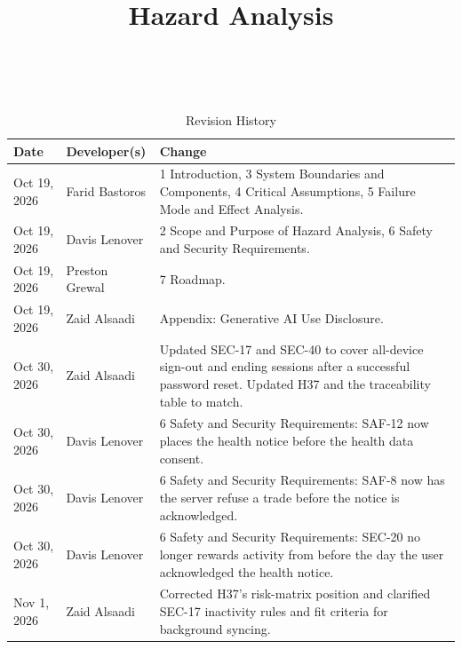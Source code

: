 \documentclass{article}
\title{Hazard Analysis\\\progname}
\author{\authname}
\date{}
\begin{document}
\maketitle
\thispagestyle{empty}

~\newpage


\begin{table}[hp]
\caption{Revision History} \label{TblRevisionHistory}
\begin{tabularx}{\textwidth}{llX}
\toprule
\textbf{Date} & \textbf{Developer(s)} & \textbf{Change}\\
\midrule
Oct 19, 2026 & Farid Bastoros & 1 Introduction, 3 System Boundaries and
Components, 4 Critical Assumptions, 5 Failure Mode and Effect Analysis.\\
Oct 19, 2026 & Davis Lenover & 2 Scope and Purpose of Hazard Analysis,
6 Safety and Security Requirements.\\
Oct 19, 2026 & Preston Grewal & 7 Roadmap.\\
Oct 19, 2026 & Zaid Alsaadi & Appendix: Generative AI Use Disclosure.\\
Oct 30, 2026 & Zaid Alsaadi & Updated SEC-17 and SEC-40 to cover
all-device sign-out and ending sessions after a successful password reset.
Updated H37 and the traceability table to match.\\
Oct 30, 2026 & Davis Lenover & 6 Safety and Security Requirements: SAF-12 now
places the health notice before the health data consent.\\
Oct 30, 2026 & Davis Lenover & 6 Safety and Security Requirements: SAF-8 now has
the server refuse a trade before the notice is acknowledged.\\
Oct 30, 2026 & Davis Lenover & 6 Safety and Security Requirements: SEC-20 no
longer rewards activity from before the day the user acknowledged the health
notice.\\
Nov 1, 2026 & Zaid Alsaadi & Corrected H37's risk-matrix position and
clarified SEC-17 inactivity rules and fit criteria for background syncing.\\
\bottomrule
\end{tabularx}
\end{table}


~\newpage

\tableofcontents

\listoffigures

\listoftables

~\newpage

\end{document}
